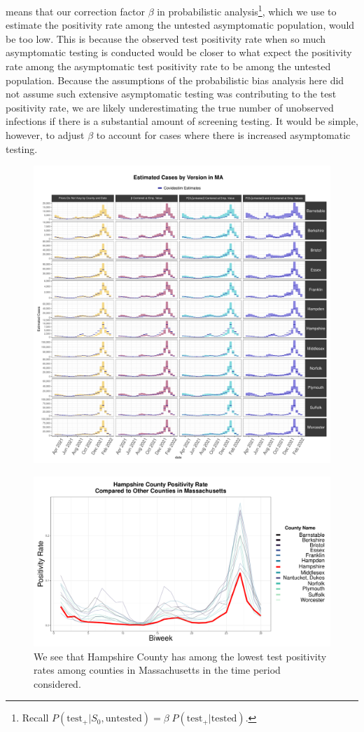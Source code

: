 \documentclass[12pt,twoside]{smiththesis}
\begin{document}
means that our correction factor \(\beta\) in probabilistic analysis\footnote{Recall \(P(\text{test}_+ | S_0, \text{untested}) = \beta \; P(\text{test}_+|\text{tested})\).}, which we use to estimate the positivity rate among the untested asymptomatic population, would be too low. This is because the observed test positivity rate when so much asymptomatic testing is conducted would be closer to what expect the positivity rate among the asymptomatic test positivity rate to be among the untested population. Because the assumptions of the probabilistic bias analysis here did not assume such extensive asymptomatic testing was contributing to the test positivity rate, we are likely underestimating the true number of unobserved infections if there is a substantial amount of screening testing. It would be simple, however, to adjust \(\beta\) to account for cases where there is increased asymptomatic testing.
\begin{figure}
\includegraphics[width=1\linewidth]{figure/ma_pb_compared_to_covidestim} \caption{\label{fig:pb_covidestim_ma}}\label{fig:unnamed-chunk-73}
\end{figure}
\begin{figure}
\includegraphics[width=0.9\linewidth]{figure/hampshire} \caption{\label{fig:hamp} We see that Hampshire County has among the lowest test positivity rates among counties in Massachusetts in the time period considered.}\label{fig:unnamed-chunk-74}
\end{figure}
\end{document}
